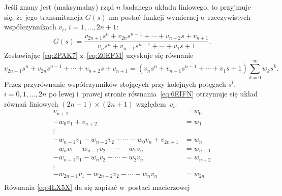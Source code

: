 \documentclass[paper=a4,DIV=12]{lpas}
\begin{document}
\begin{appendices}
  Jeśli znany jest (maksymalny) rząd $n$ badanego układu liniowego, to
  przyjmuje się, że jego transmitancja $G(s)$ ma postać funkcji wymiernej
  o~rzeczywistych współczynnikach $v_i$, $i=1,\dots,2n+1$:
  \begin{equation}
    G(s) = \frac{v_{2n+1} s^n + v_{2n} s^{n-1} + \cdots + v_{n+2} s + v_{n+1}}
                {v_n s^n + v_{n-1} s^{n-1} + \cdots + v_1 s + 1}.
    \label{eq:Z0EFM}
  \end{equation}
  Zestawiając \eqref{eq:2PAK7} z~\eqref{eq:Z0EFM} uzyskuje się równanie
  \begin{equation}
      v_{2n+1} s^n + v_{2n} s^{n-1} + \cdots + v_{n+2} s + v_{n+1}
      = \left(
          v_n s^n + v_{n-1} s^{n-1} + \cdots + v_1 s + 1
        \right) \sum_{k=0}^{\infty} w_k s^k.
    \label{eq:6EIFN}
  \end{equation}
  Przez przyrównanie współczynników stojących przy kolejnych potęgach $s^i$,
  $i=0,1,\dots,2n$ po lewej i~prawej stronie równania~\eqref{eq:6EIFN}
  otrzymuje się układ równań liniowych $(2n+1) \times (2n+1)$ względem~$v_i$:
  \begin{equation}
    \begin{aligned}
      v_{n+1} & = w_0 \\
    - w_0 v_1 + v_{n+2} & = w_1 \\
      \vdots  & \\
   -  w_{n-1} v_1 - w_{n-2} v_2 - \cdots - w_0 v_n + v_{2n+1} &= w_n \\
      - w_n v_1 - w_{n-1} v_2 - \cdots - w_1 v_n &=  w_{n+1} \\
      - w_{n+1} v_1 - w_n v_2 - \cdots - w_2 v_n & = w_{n+2} \\
      \vdots & \\
      - w_{2n-1} v_1 - w_{2n-2} v_2 - \cdots - w_n v_n & = w_{2n} \\
    \end{aligned}
    \label{eq:4LX5X}
  \end{equation}
  Równania \eqref{eq:4LX5X} da się zapisać w~postaci macierzowej

\end{appendices}
\end{document}
